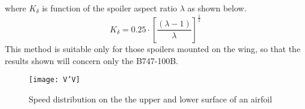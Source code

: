 %
\noindent
where $K_\delta$ is function of the spoiler aspect ratio $\lambda$ as shown below.
%
\begin{equation}
K_\delta=0.25\cdot\left[\dfrac{\left(\lambda-1\right)}{\lambda}\right]^{\frac{1}{2}}
\end{equation}
%
\noindent
This method is suitable only for those spoilers mounted on the wing, so that the results shown will concern only the B747-100B.
%
\begin{table}[H]
  \centering
{}
      \caption{$\upDelta C_{D0,\text{spoiler}}$ of B747-100B and ATR-72 using equation \ref{eqn:LausettiSpoiler}}
\end{table}

%
\begin{figure}[H]
\centering
\texttt{[image: V'V]}
\caption{Speed distribution on the the upper and lower surface of an airfoil}
\label{fig:InterferenceSpoiler}
\end{figure}
%